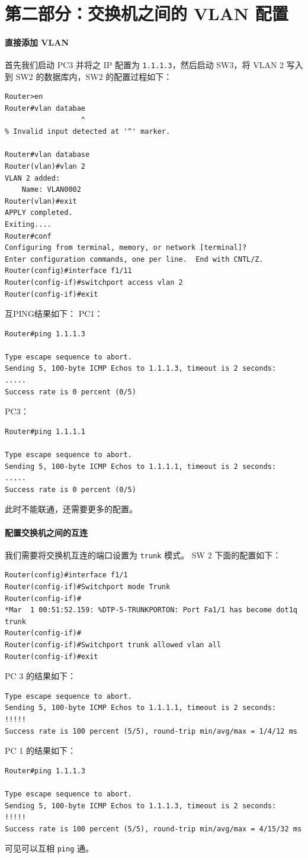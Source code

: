 \documentclass[black,normal,cn]{elegantnote}
\begin{document}
\section{第二部分：交换机之间的 VLAN 配置}
\paragraph{直接添加 VLAN}
首先我们启动 PC3 并将之 IP 配置为 \texttt{1.1.1.3}，然后启动 SW3，将 VLAN 2 写入到 SW2 的数据库内，SW2 的配置过程如下：
\begin{lstlisting}
Router>en
Router#vlan databae
                  ^
% Invalid input detected at '^' marker.

Router#vlan database
Router(vlan)#vlan 2
VLAN 2 added:
    Name: VLAN0002
Router(vlan)#exit
APPLY completed.
Exiting....
Router#conf
Configuring from terminal, memory, or network [terminal]?
Enter configuration commands, one per line.  End with CNTL/Z.
Router(config)#interface f1/11
Router(config-if)#switchport access vlan 2
Router(config-if)#exit
\end{lstlisting}
互PING结果如下：
PC1：
\begin{lstlisting}
Router#ping 1.1.1.3

Type escape sequence to abort.
Sending 5, 100-byte ICMP Echos to 1.1.1.3, timeout is 2 seconds:
.....
Success rate is 0 percent (0/5)
\end{lstlisting}
PC3：
\begin{lstlisting}
Router#ping 1.1.1.1

Type escape sequence to abort.
Sending 5, 100-byte ICMP Echos to 1.1.1.1, timeout is 2 seconds:
.....
Success rate is 0 percent (0/5)
\end{lstlisting}
此时不能联通，还需要更多的配置。

\paragraph{配置交换机之间的互连}
我们需要将交换机互连的端口设置为 \texttt{trunk} 模式。
SW 2 下面的配置如下：
\begin{lstlisting}
Router(config)#interface f1/1
Router(config-if)#Switchport mode Trunk
Router(config-if)#
*Mar  1 00:51:52.159: %DTP-5-TRUNKPORTON: Port Fa1/1 has become dot1q trunk
Router(config-if)#
Router(config-if)#Switchport trunk allowed vlan all
Router(config-if)#exit
\end{lstlisting}
PC 3 的结果如下：
\begin{lstlisting}
Type escape sequence to abort.
Sending 5, 100-byte ICMP Echos to 1.1.1.1, timeout is 2 seconds:
!!!!!
Success rate is 100 percent (5/5), round-trip min/avg/max = 1/4/12 ms
\end{lstlisting}
PC 1 的结果如下：
\begin{lstlisting}
Router#ping 1.1.1.3

Type escape sequence to abort.
Sending 5, 100-byte ICMP Echos to 1.1.1.3, timeout is 2 seconds:
!!!!!
Success rate is 100 percent (5/5), round-trip min/avg/max = 4/15/32 ms
\end{lstlisting}
可见可以互相 \texttt{ping} 通。
\end{document}

